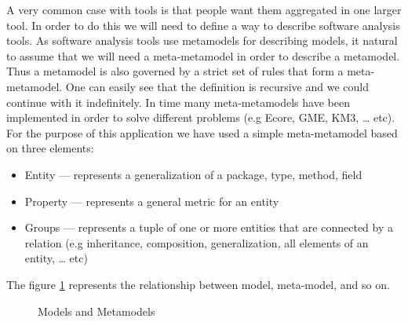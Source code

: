 	A very common case with tools is that people want them aggregated in one larger
tool. In order to do this we will need to define a way to describe software
analysis tools. As software analysis tools use metamodels for describing models,
it natural to assume that we will need a meta-metamodel in order to describe a
metamodel. Thus a metamodel is also governed by a strict set of rules that form
a meta-metamodel. One can easily see that the definition is recursive and we
could continue with it indefinitely. In time many meta-metamodels have been
implemented in order to solve different problems (e.g Ecore, GME, KM3, \ldots{}
etc). For the purpose of this application we have used a simple meta-metamodel
based on three elements: 
	\begin{itemize}
		\item Entity --- represents a generalization of a package, type, method, 
field 
		\item Property --- represents a general metric for an entity
		\item Groups --- represents a tuple of one or more entities that are connected
by a relation (e.g inheritance, composition, generalization, all elements of an
entity, \ldots{} etc)
	\end{itemize}
	
	The figure \ref{fig:metamodel} represents the relationship between model,
meta-model, and so on.
	 

\begin{figure}
\centering
{}
\caption{Models and Metamodels\label{fig:metamodel}}
\end{figure}
		
